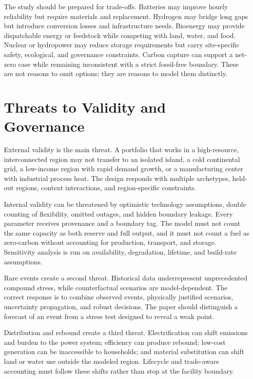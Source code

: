 \documentclass[conference]{IEEEtran}
\begin{document}
The study should be prepared for trade-offs. Batteries may improve hourly reliability but require materials and replacement. Hydrogen may bridge long gaps but introduce conversion losses and infrastructure needs. Bioenergy may provide dispatchable energy or feedstock while competing with land, water, and food. Nuclear or hydropower may reduce storage requirements but carry site-specific safety, ecological, and governance constraints. Carbon capture can support a net-zero case while remaining inconsistent with a strict fossil-free boundary. These are not reasons to omit options; they are reasons to model them distinctly.

\section{Threats to Validity and Governance}
\label{sec:threats}
External validity is the main threat. A portfolio that works in a high-resource, interconnected region may not transfer to an isolated island, a cold continental grid, a low-income region with rapid demand growth, or a manufacturing center with industrial process heat. The design responds with multiple archetypes, held-out regions, context interactions, and region-specific constraints.

Internal validity can be threatened by optimistic technology assumptions, double counting of flexibility, omitted outages, and hidden boundary leakage. Every parameter receives provenance and a boundary tag. The model must not count the same capacity as both reserve and full output, and it must not count a fuel as zero-carbon without accounting for production, transport, and storage. Sensitivity analysis is run on availability, degradation, lifetime, and build-rate assumptions.

Rare events create a second threat. Historical data underrepresent unprecedented compound stress, while counterfactual scenarios are model-dependent. The correct response is to combine observed events, physically justified scenarios, uncertainty propagation, and robust decisions. The paper should distinguish a forecast of an event from a stress test designed to reveal a weak point.

Distribution and rebound create a third threat. Electrification can shift emissions and burden to the power system; efficiency can produce rebound; low-cost generation can be inaccessible to households; and material substitution can shift land or water use outside the modeled region. Lifecycle and trade-aware accounting must follow these shifts rather than stop at the facility boundary.
\end{document}
